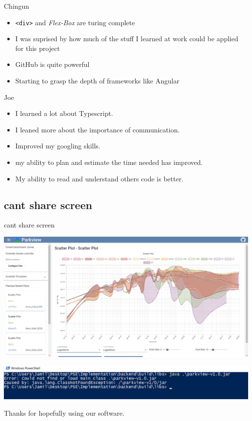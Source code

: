 \documentclass{beamer}
\begin{document}
\begin{frame}{Chingun}
    \begin{itemize}
      \item \texttt{<div>} and \textit{Flex-Box} are turing complete
      \item I was suprised by how much of the stuff I learned at work could be applied for this project
      \item GitHub is quite powerful
      \item Starting to grasp the depth of frameworks like Angular
    \end{itemize}
\end{frame}

\begin{frame}{Joe}
    \begin{itemize}
	\item I learned a lot about Typescript.
    	\item I leaned more about the importance of communication.
    	\item Improved my googling skills.
   	\item my ability to plan and estimate the time needed has improved.
    	\item My ability to read and understand others code is better.
    \end{itemize}
\end{frame}

\subsection{cant share screen}
\begin{frame}{cant share screen}
  \begin{center}
   \includegraphics[scale=0.25]{smoothed}







   \includegraphics[scale=0.5]{no-main}
  \end{center}
\end{frame}

\begin{frame}
  \begin{center}
    \Huge{Thanks for hopefully using our software.}
  \end{center}
\end{frame}
\end{document}
